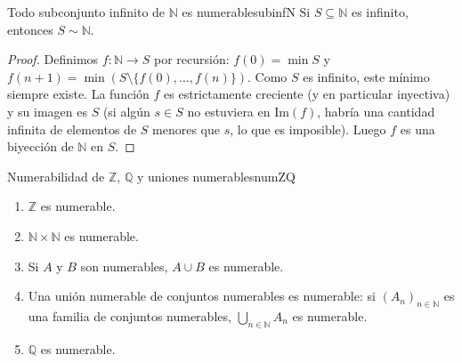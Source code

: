 \begin{proposicion}{Todo subconjunto infinito de $\mathbb{N}$ es numerable}{subinfN}
Si $S \subseteq \mathbb{N}$ es infinito, entonces $S \sim \mathbb{N}$.
\end{proposicion}

\begin{proof}
Definimos $f: \mathbb{N} \to S$ por recursión: $f(0) = \min S$ y $f(n+1) = \min(S \setminus \{f(0), \ldots, f(n)\})$. Como $S$ es infinito, este mínimo siempre existe. La función $f$ es estrictamente creciente (y en particular inyectiva) y su imagen es $S$ (si algún $s \in S$ no estuviera en $\mathrm{Im}(f)$, habría una cantidad infinita de elementos de $S$ menores que $s$, lo que es imposible). Luego $f$ es una biyección de $\mathbb{N}$ en $S$.
\end{proof}

\begin{teorema}{Numerabilidad de $\mathbb{Z}$, $\mathbb{Q}$ y uniones numerables}{numZQ}
\begin{enumerate}[leftmargin=2em, label=(\roman*)]
  \item $\mathbb{Z}$ es numerable.
  \item $\mathbb{N} \times \mathbb{N}$ es numerable.
  \item Si $A$ y $B$ son numerables, $A \cup B$ es numerable.
  \item Una unión numerable de conjuntos numerables es numerable: si $(A_n)_{n \in \mathbb{N}}$ es una familia de conjuntos numerables, $\bigcup_{n \in \mathbb{N}} A_n$ es numerable.
  \item $\mathbb{Q}$ es numerable.
\end{enumerate}
\end{teorema}

